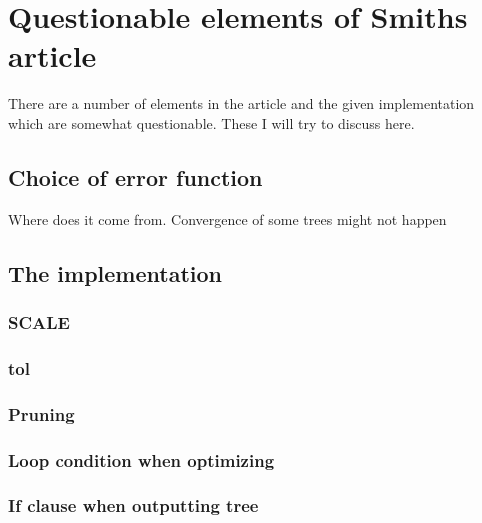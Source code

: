 \section{Questionable elements of Smiths article}
\label{sec:quest-elem-smiths}

There are a number of elements in the article and the given
implementation~\cite{Smith1992} which are somewhat questionable.  These I will
try to discuss here.

\subsection{Choice of error function}
\label{sec:choice-error-funct}
Where does it come from.  Convergence of some trees might not happen

\subsection{The implementation}
\label{sec:implementation}

\subsubsection{SCALE}
\label{sec:scale}

\subsubsection{tol}
\label{sec:tol}

\subsubsection{Pruning}
\label{sec:pruning}

\subsubsection{Loop condition when optimizing}
\label{sec:loop-condition-when-1}

\subsubsection{If clause when outputting tree}
\label{sec:if-clause-when}

\chapterbreak{}

